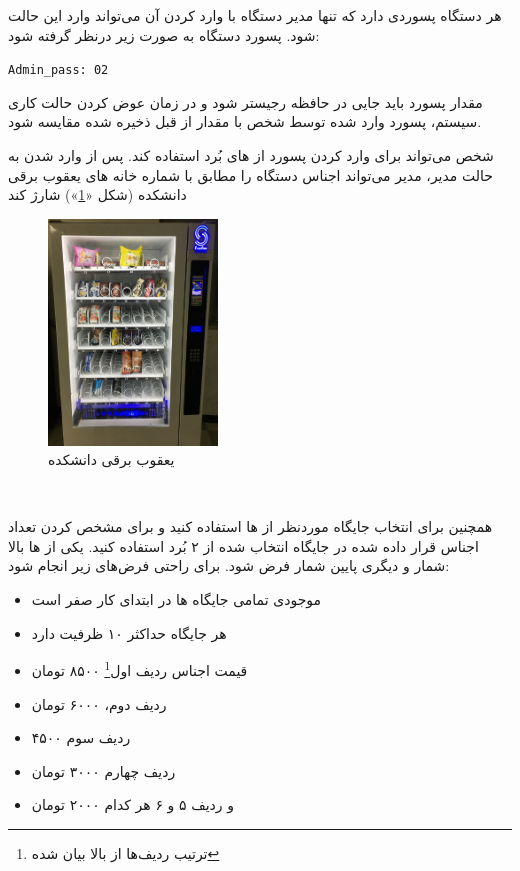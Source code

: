 \documentclass[]{article}
\begin{document}
هر دستگاه پسوردی دارد که تنها مدیر دستگاه با وارد کردن آن می‌تواند وارد این حالت شود. پسورد دستگاه به صورت زیر درنظر گرفته شود:

\begin{latin}
	\texttt{Admin\_pass: 02}
\end{latin}



مقدار پسورد باید جایی در حافظه رجیستر شود و در زمان عوض کردن حالت کاری سیستم، پسورد وارد شده توسط شخص با مقدار از قبل ذخیره شده مقایسه شود.

شخص می‌تواند برای وارد کردن پسورد از  های بُرد استفاده کند. پس از وارد شدن به حالت مدیر، مدیر می‌تواند اجناس دستگاه را مطابق با شماره خانه های یعقوب برقی دانشکده (شکل «\textcolor{blue}{\ref{یعقوب برقی دانشکده}}») شارژ کند



\begin{figure}[h]
	\centering
	\includegraphics[width=0.4\textwidth]{images/img2.jpg}
	\caption{یعقوب برقی دانشکده}
	\label{یعقوب برقی دانشکده}
\end{figure}

\newpage
\Large \textbf{\\
}

همچنین برای انتخاب جایگاه موردنظر از  ها استفاده کنید و برای مشخص کردن تعداد اجناس قرار داده شده در جایگاه انتخاب شده از ۲  بُرد استفاده کنید. یکی از  ها بالا شمار و دیگری پایین شمار فرض شود. برای راحتی فرض‌های زیر انجام شود:

\begin{itemize}
	\item موجودی تمامی جایگاه ها در ابتدای کار صفر است
	\item هر جایگاه حداکثر ۱۰ ظرفیت دارد
	\item قیمت اجناس ردیف اول\footnote{ترتیب ردیف‌ها از بالا بیان شده} ۸۵۰۰ تومان
	\item ردیف دوم، ۶۰۰۰ تومان
	\item ردیف سوم ۴۵۰۰
	\item ردیف چهارم ۳۰۰۰ تومان
	\item و ردیف ۵ و ۶ هر کدام ۲۰۰۰ تومان
\end{itemize}
\end{document}
